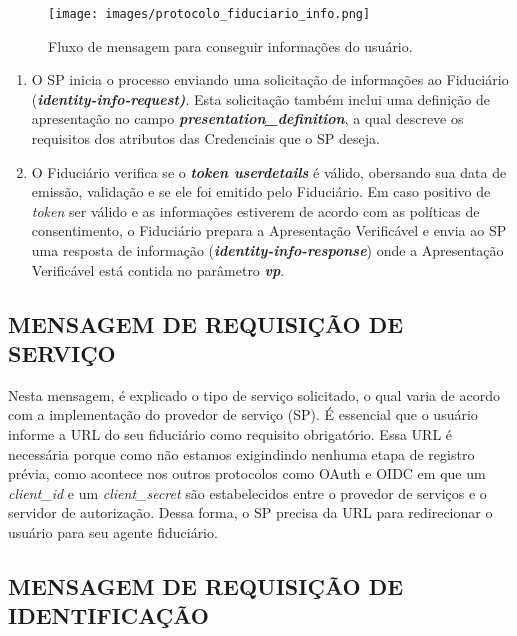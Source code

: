 \begin{figure}[h]
    \centering
    \texttt{[image: images/protocolo\_fiduciario\_info.png]}
    \caption{Fluxo de mensagem para conseguir informações do usuário.}
    \label{fig:fluxo-info}
\end{figure}

\begin{enumerate}
    \item O \acs{SP} inicia o processo enviando uma solicitação de informações ao Fiduciário (\textit{\textbf{identity-info-request)}}. Esta solicitação também inclui uma definição de apresentação no campo \textit{\textbf{presentation\_definition}}, a qual descreve os requisitos dos atributos das Credenciais que o \acs{SP} deseja.
    
    \item O Fiduciário verifica se o \textbf{\textit{token userdetails}} é válido, obersando sua data de emissão, validação e se ele foi emitido pelo Fiduciário. Em caso positivo de \textit{token} ser válido e as informações estiverem de acordo com as políticas de consentimento, o Fiduciário prepara a Apresentação Verificável e  envia ao \acs{SP} uma resposta de informação (\textbf{\textit{identity-info-response}}) onde a Apresentação Verificável está contida no parâmetro \textbf{\textit{vp}}.

\end{enumerate}

\subsection{MENSAGEM DE REQUISIÇÃO DE SERVIÇO}

Nesta mensagem, é explicado o tipo de serviço solicitado, o qual varia de acordo com a implementação do provedor de serviço (SP). É essencial que o usuário informe a URL do seu fiduciário como requisito obrigatório. Essa URL é necessária porque como não estamos exigindindo nenhuma etapa de registro prévia, como acontece nos outros protocolos como OAuth e OIDC em que um \textit{client\_id} e um \textit{client\_secret} são estabelecidos entre o provedor de serviços e o servidor de autorização. Dessa forma, o \ac{SP} precisa da URL para redirecionar o usuário para seu agente fiduciário.


\subsection{MENSAGEM DE REQUISIÇÃO DE IDENTIFICAÇÃO}

